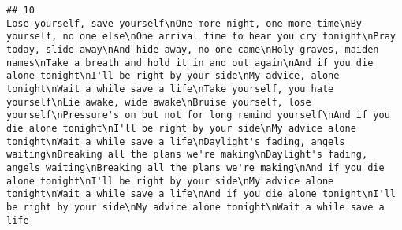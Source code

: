 \documentclass[]{article}
\begin{document}
\begin{verbatim}
## 10                                                                                                                                                                                                                                                                                                                                                                                                                                                                                                                                                                                                                                                                                                                                                                                                                                                                                                                                                                                                                                                                                                                                                                                                                                                                                                                                                                                                                                                                                                                                                                                                                                                                                                                                                                                                                                                                                                                                                                                                                                                                                                                                  Lose yourself, save yourself\nOne more night, one more time\nBy yourself, no one else\nOne arrival time to hear you cry tonight\nPray today, slide away\nAnd hide away, no one came\nHoly graves, maiden names\nTake a breath and hold it in and out again\nAnd if you die alone tonight\nI'll be right by your side\nMy advice, alone tonight\nWait a while save a life\nTake yourself, you hate yourself\nLie awake, wide awake\nBruise yourself, lose yourself\nPressure's on but not for long remind yourself\nAnd if you die alone tonight\nI'll be right by your side\nMy advice alone tonight\nWait a while save a life\nDaylight's fading, angels waiting\nBreaking all the plans we're making\nDaylight's fading, angels waiting\nBreaking all the plans we're making\nAnd if you die alone tonight\nI'll be right by your side\nMy advice alone tonight\nWait a while save a life\nAnd if you die alone tonight\nI'll be right by your side\nMy advice alone tonight\nWait a while save a life

\end{verbatim}
\end{document}
